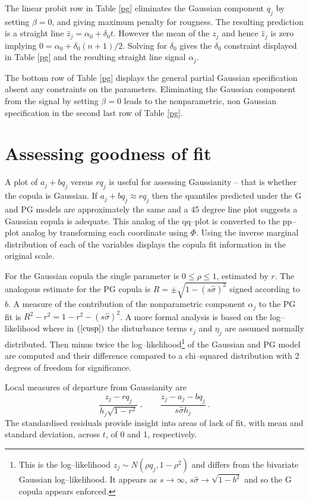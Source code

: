 \documentclass[authoryear]{elsarticle}
\newcommand{\eps}{\epsilon}
\newcommand{\eref}[1]{(\ref{#1})}
\newcommand{\tref}[1]{Table \ref{#1}}
\newcommand{\cq}{\ , \qquad}
\newcommand{\be}[1]{\begin{equation}\label{#1}}
\newcommand{\ee}{\end{equation}}
\begin{document}
The linear probit row in \tref{pg}  eliminates the Gaussian component $q_j$ by setting $\beta=0$, and giving maximum penalty for rougness.   The resulting prediction  is a straight line $\hat z_j=\alpha_0+\delta_0 t$.  However the mean of the $z_j$ and hence $\hat z_j$ is zero implying $0=\alpha_0 + \delta_0(n+1)/2$.   Solving for $\delta_0$ gives the $\delta_0$ constraint displayed in \tref{pg} and the resulting straight line signal $\alpha_j$.

The bottom row of \tref{pg} displays the general partial Gaussian specification absent  any constraints on the parameters.  Eliminating the Gaussian component from the signal by setting $\beta=0$ leads to the nonparametric, non Gaussian specification in the second last row of \tref{pg}.

\section{Assessing goodness of fit}

A plot of $a_j+b q_j$ versus $r q_j$ is useful for assessing Gaussianity -- that is whether the copula  is Gaussian.   If $a_j+bq_j\approx rq_j$ then the quantiles predicted under the G and PG models are approximately the same and  a 45 degree line plot suggests a Gaussian copula is adequate.     This analog of the qq--plot is converted to the pp--plot analog  by transforming each coordinate using $\Phi$.   Using the inverse marginal distribution of each of the variables displays the copula fit information in the original scale. 

For the Gaussian copula the single parameter is $0\le\rho\le 1$, estimated by  $r$.   The analogous estimate for the PG copula is $R=\pm\sqrt{1-(s\hat\sigma)^2}$ signed according to $b$.   A measure of the  contribution of the nonparametric component $\alpha_j$  to the PG fit is  
$
R^2-r^2 = 1-r^2 - (s\hat\sigma)^2
$.
A more formal analysis is based on the log--likelihood where in $\eref{cusp}$ the disturbance terms $\eps_j$ and $\eta_j$ are assumed normally distributed.    Then  minus twice the log--likelihood\footnote{This is the log--likelihood $z_j\sim N(\rho q_j,1-\rho^2)$ and differs from the bivariate Gaussian log--likelihood.  It appears  as  $s\rightarrow\infty$, $s\hat\sigma\rightarrow\sqrt{ 1-b^2}$ and so the G copula appears enforced.}  of the Gaussian and  PG model  are computed and their difference compared to a chi--squared distribution with 2 degrees of freedom for significance.

Local  measures of departure from Gaussianity are 
\be{lr}
\frac{z_j-r q_j}{h_j\sqrt{1-r^2}}\cq \frac{z_j-a_j-bq_j}{ s\hat\sigma h_j}\ .
\ee
The  standardised residuals
provide insight into areas of lack of fit, with mean and standard deviation, across $t$,  of 0 and 1, respectively.
\end{document}
